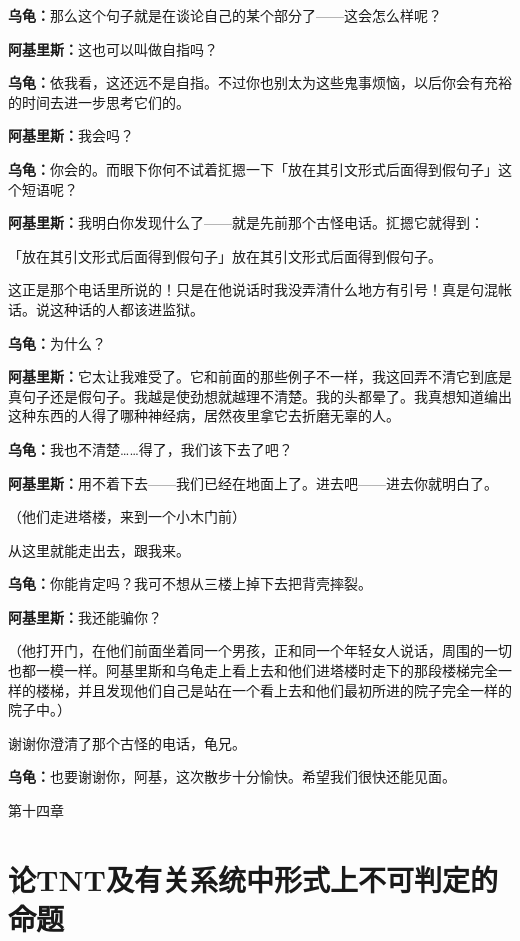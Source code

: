 \documentclass[
  12pt,
  twoside,
  openright,
  oldfontcommands,
]{memoir}
\newcommand{\dialogname}[1]{{\heifamily\bfseries #1}}
\begin{document}
\dialogname{乌龟：}那么这个句子就是在谈论自己的某个部分了------这会怎么样呢？

\dialogname{阿基里斯：}这也可以叫做自指吗？

\dialogname{乌龟：}依我看，这还远不是自指。不过你也别太为这些鬼事烦恼，以后你会有充裕的时间去进一步思考它们的。

\dialogname{阿基里斯：}我会吗？

\dialogname{乌龟：}你会的。而眼下你何不试着㧟摁一下「放在其引文形式后面得到假句子」这个短语呢？

\dialogname{阿基里斯：}我明白你发现什么了------就是先前那个古怪电话。㧟摁它就得到：

「放在其引文形式后面得到假句子」放在其引文形式后面得到假句子。

这正是那个电话里所说的！只是在他说话时我没弄清什么地方有引号！真是句混帐话。说这种话的人都该进监狱。

\dialogname{乌龟：}为什么？

\dialogname{阿基里斯：}它太让我难受了。它和前面的那些例子不一样，我这回弄不清它到底是真句子还是假句子。我越是使劲想就越理不清楚。我的头都晕了。我真想知道编出这种东西的人得了哪种神经病，居然夜里拿它去折磨无辜的人。

\dialogname{乌龟：}我也不清楚\ldots\ldots 得了，我们该下去了吧？

\dialogname{阿基里斯：}用不着下去------我们已经在地面上了。进去吧------进去你就明白了。

（他们走进塔楼，来到一个小木门前）

从这里就能走出去，跟我来。

\dialogname{乌龟：}你能肯定吗？我可不想从三楼上掉下去把背壳摔裂。

\dialogname{阿基里斯：}我还能骗你？

（他打开门，在他们前面坐着同一个男孩，正和同一个年轻女人说话，周围的一切也都一模一样。阿基里斯和乌龟走上看上去和他们进塔楼时走下的那段楼梯完全一样的楼梯，并且发现他们自己是站在一个看上去和他们最初所进的院子完全一样的院子中。）

谢谢你澄清了那个古怪的电话，龟兄。

\dialogname{乌龟：}也要谢谢你，阿基，这次散步十分愉快。希望我们很快还能见面。

\label{Chapter14.xhtml}{}

第十四章

\section[论TNT及有关系统中形式上不可判定的命题]{\texorpdfstring{论TNT及有关系统中形式上不可判定的命题}{论TNT及有关系统中形式上不可判定的命题\hyperref[fn:Chapter14-1]{\textsuperscript{1}}}}
\end{document}

